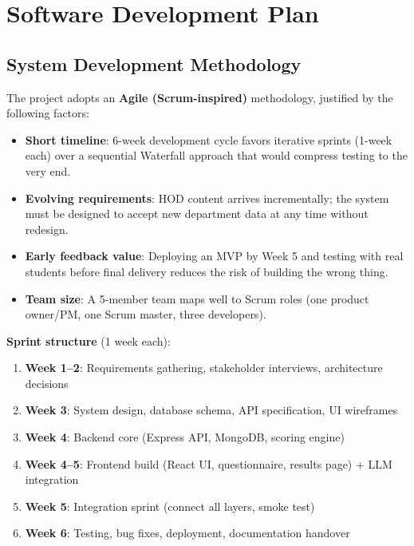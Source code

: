 \documentclass[12pt, a4paper]{article}
\begin{document}
\clearpage
\section{Software Development Plan}
\subsection{System Development Methodology}

The project adopts an \textbf{Agile (Scrum-inspired)} methodology, justified by the following factors:

\begin{itemize}[leftmargin=1.5em, itemsep=3pt]
    \item \textbf{Short timeline}: 6-week development cycle favors iterative sprints (1-week each) over a sequential Waterfall approach that would compress testing to the very end.
    \item \textbf{Evolving requirements}: HOD content arrives incrementally; the system must be designed to accept new department data at any time without redesign.
    \item \textbf{Early feedback value}: Deploying an MVP by Week 5 and testing with real students before final delivery reduces the risk of building the wrong thing.
    \item \textbf{Team size}: A 5-member team maps well to Scrum roles (one product owner/PM, one Scrum master, three developers).
\end{itemize}

\textbf{Sprint structure} (1 week each):
\begin{enumerate}[leftmargin=1.5em, itemsep=2pt]
    \item \textbf{Week 1--2}: Requirements gathering, stakeholder interviews, architecture decisions
    \item \textbf{Week 3}: System design, database schema, API specification, UI wireframes
    \item \textbf{Week 4}: Backend core (Express API, MongoDB, scoring engine)
    \item \textbf{Week 4--5}: Frontend build (React UI, questionnaire, results page) + LLM integration
    \item \textbf{Week 5}: Integration sprint (connect all layers, smoke test)
    \item \textbf{Week 6}: Testing, bug fixes, deployment, documentation handover
\end{enumerate}
\end{document}
